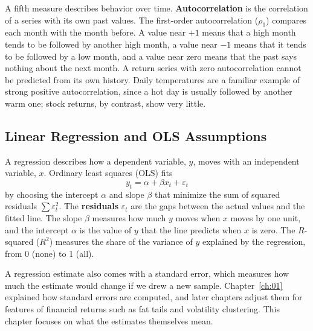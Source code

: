 A fifth measure describes behavior over time. \textbf{Autocorrelation} is the correlation of a series with its own past values. The first-order autocorrelation ($\rho_1$) compares each month with the month before. A value near $+1$ means that a high month tends to be followed by another high month, a value near $-1$ means that it tends to be followed by a low month, and a value near zero means that the past says nothing about the next month. A return series with zero autocorrelation cannot be predicted from its own history. Daily temperatures are a familiar example of strong positive autocorrelation, since a hot day is usually followed by another warm one; stock returns, by contrast, show very little.


\subsection{Linear Regression and OLS Assumptions}
\label{sec:04-regression}
A regression describes how a dependent variable, $y$, moves with an independent variable, $x$. Ordinary least squares (OLS) fits
\begin{equation}
  y_t = \alpha + \beta x_t + \varepsilon_t
  \label{eq:04-ols}
\end{equation}
by choosing the intercept $\alpha$ and slope $\beta$ that minimize the sum of squared residuals $\sum \varepsilon_t^2$. The \textbf{residuals} $\varepsilon_t$ are the gaps between the actual values and the fitted line. The slope $\beta$ measures how much $y$ moves when $x$ moves by one unit, and the intercept $\alpha$ is the value of $y$ that the line predicts when $x$ is zero. The $R$-squared ($R^2$) measures the share of the variance of $y$ explained by the regression, from 0 (none) to 1 (all).

A regression estimate also comes with a standard error, which measures how much the estimate would change if we drew a new sample. Chapter~\ref{ch:01} explained how standard errors are computed, and later chapters adjust them for features of financial returns such as fat tails and volatility clustering. This chapter focuses on what the estimates themselves mean.

